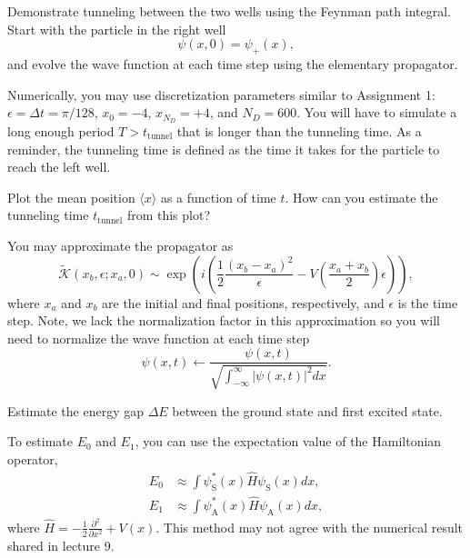 \begin{problem}[10]
Demonstrate tunneling between the two wells using the Feynman path integral.
Start with the particle in the right well
\begin{equation}
  \psi(x, 0) = \psi_+(x),
\end{equation}
and evolve the wave function at each time step using the elementary propagator.

Numerically, you may use discretization parameters similar to Assignment 1: $\epsilon = \Delta t = \pi/128$, $x_0 = -4$, $x_{N_D} = +4$, and $N_D=600$.
You will have to simulate a long enough period $T > t_\mathrm{tunnel}$ that is longer than the tunneling time.
As a reminder, the tunneling time is defined as the time it takes for the particle to reach the left well.

Plot the mean position $\langle x \rangle$ as a function of time $t$.
How can you estimate the tunneling time $t_\mathrm{tunnel}$ from this plot?

\begin{hint}
  You may approximate the propagator as
  \begin{equation}
    \tilde {\mathcal K}(x_b, \epsilon; x_a, 0) \sim \exp \left( i \left(\frac{1}{2}\frac{(x_b - x_a)^2}{\epsilon} - V\left(\frac{x_a+x_b}{2}\right) \epsilon\right) \right),
  \end{equation}
  where $x_a$ and $x_b$ are the initial and final positions, respectively, and $\epsilon$ is the time step.
  Note, we lack the normalization factor in this approximation so you will need to normalize the wave function at each time step
  \begin{equation}
    \psi(x, t) \leftarrow \frac{\psi(x, t)}{\sqrt{\int_{-\infty}^{\infty} |\psi(x, t)|^2 dx}}.
  \end{equation}
\end{hint}
\end{problem}

\begin{solution}
\end{solution}

\begin{problem}[10]
Estimate the energy gap $\Delta E$ between the ground state and first excited state.

\begin{hint}
  To estimate $E_0$ and $E_1$, you can use the expectation value of the Hamiltonian operator,
  \begin{align}
    E_0 & \approx \int \psi_\mathrm{S}^*(x) \hat H \psi_\mathrm{S}(x) dx, \\
    E_1 & \approx \int \psi_\mathrm{A}^*(x) \hat H \psi_\mathrm{A}(x) dx,
  \end{align}
  where $\hat H = -\frac{1}{2}\frac{\partial^2}{\partial x^2} + V(x)$.
  This method may not agree with the numerical result shared in lecture 9.
\end{hint}
\end{problem}

